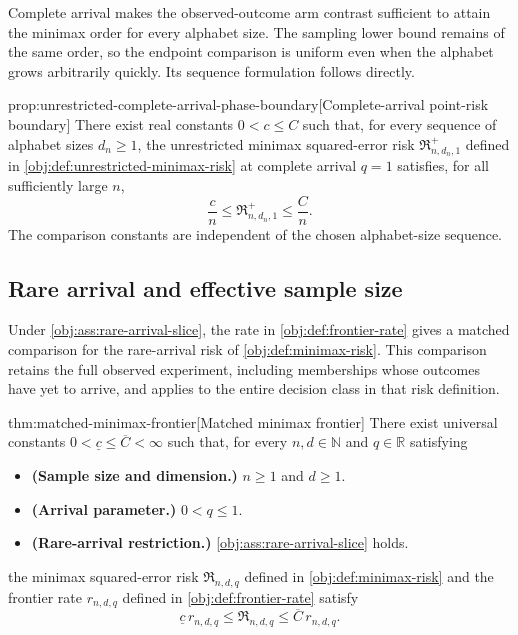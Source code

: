 Complete arrival makes the observed-outcome arm contrast sufficient to attain the minimax order for every alphabet size. The sampling lower bound remains of the same order, so the endpoint comparison is uniform even when the alphabet grows arbitrarily quickly. Its sequence formulation follows directly.

\begin{propositionv}{prop:unrestricted-complete-arrival-phase-boundary}[Complete-arrival point-risk boundary]
There exist real constants \(0<c\le C\) such that, for every sequence of alphabet sizes \(d_n\ge1\), the unrestricted minimax squared-error risk \(\mathfrak R^{+}_{n,d_n,1}\) defined in \cref{obj:def:unrestricted-minimax-risk} at complete arrival \(q=1\) satisfies, for all sufficiently large \(n\),
\[
\frac{c}{n}\le \mathfrak R^{+}_{n,d_n,1}\le \frac{C}{n}.
\]
The comparison constants are independent of the chosen alphabet-size sequence.
\end{propositionv}

\subsection{Rare arrival and effective sample size}

Under \cref{obj:ass:rare-arrival-slice}, the rate in \cref{obj:def:frontier-rate} gives a matched comparison for the rare-arrival risk of \cref{obj:def:minimax-risk}. This comparison retains the full observed experiment, including memberships whose outcomes have yet to arrive, and applies to the entire decision class in that risk definition.

\begin{theoremv}{thm:matched-minimax-frontier}[Matched minimax frontier]
There exist universal constants \(0<\underline c\le\overline C<\infty\) such that, for every \(n,d\in\mathbb N\) and \(q\in\mathbb R\) satisfying
\begin{itemize}
\item \textbf{(Sample size and dimension.)} \(n\ge1\) and \(d\ge1\).
\item \textbf{(Arrival parameter.)} \(0<q\le1\).
\item \textbf{(Rare-arrival restriction.)} \cref{obj:ass:rare-arrival-slice} holds.
\end{itemize}
the minimax squared-error risk \(\mathfrak R_{n,d,q}\) defined in \cref{obj:def:minimax-risk} and the frontier rate \(r_{n,d,q}\) defined in \cref{obj:def:frontier-rate} satisfy
\[
\underline c\,r_{n,d,q}
\le \mathfrak R_{n,d,q}
\le \overline C\,r_{n,d,q}.
\]
\end{theoremv}

